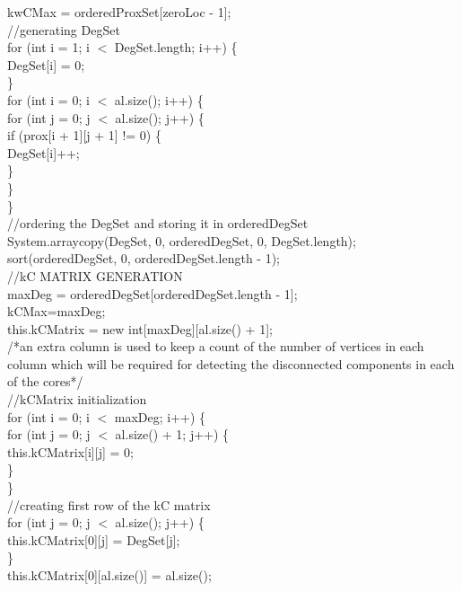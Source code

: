 \begin{ttfamily   }
\begin{scriptsize}
       \noindent kwCMax = orderedProxSet[zeroLoc - 1];\\

        \noindent//generating DegSet\\
        \noindent for (int i = 1;   i $<$ DegSet.length;   i++) \{\\
            DegSet[i] = 0;\\
        \}\\
        \noindent for (int i = 0;   i $<$ al.size();   i++) \{\\
            \noindent for (int j = 0;   j $<$ al.size();   j++) \{\\
                if (prox[i + 1][j + 1] != 0) \{\\
                    DegSet[i]++;\\
                \}\\
            \}\\
        \}\\

        \noindent//ordering the DegSet and storing it in orderedDegSet\\
        System.arraycopy(DegSet, 0, orderedDegSet, 0, DegSet.length);\\
        sort(orderedDegSet, 0, orderedDegSet.length - 1);\\
        
        \noindent//kC  MATRIX GENERATION\\
        maxDeg = orderedDegSet[orderedDegSet.length - 1];\\
        kCMax=maxDeg;\\
        this.kCMatrix = new int[maxDeg][al.size() + 1];\\
        \noindent /*an extra column is used to keep a count of the number of vertices in each column
        which will be required for detecting the disconnected components in each of the cores*/\\

        \noindent//kCMatrix initialization\\
        \noindent for (int i = 0;   i $<$ maxDeg;   i++) \{\\
            \noindent for (int j = 0;   j $<$ al.size() + 1;   j++) \{\\
                this.kCMatrix[i][j] = 0;\\
            \}\\
        \}\\

        \noindent//creating first row of the kC matrix\\
        \noindent for (int j = 0;   j $<$ al.size();   j++) \{\\
            this.kCMatrix[0][j] = DegSet[j];\\
        \}\\
        this.kCMatrix[0][al.size()] = al.size();\\
        

\end{scriptsize}
\end{ttfamily   }
